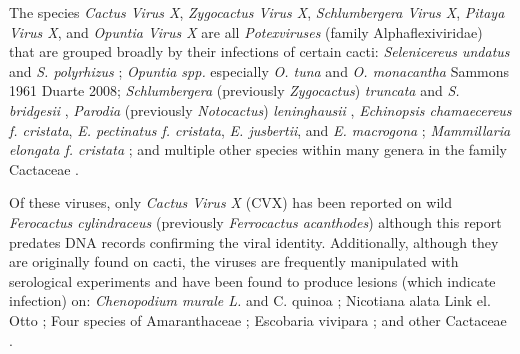 \documentclass[11pt,letterpaper,titlepage]{article}
\begin{document}
\begin{linenumbers}

The species \textit{Cactus Virus X}, \textit{Zygocactus Virus X}, \textit{Schlumbergera Virus X}, \textit{Pitaya Virus X}, and \textit{Opuntia Virus X} are all \textit{Potexviruses} (family Alphaflexiviridae) that are grouped broadly by their infections of certain cacti: \textit{Selenicereus undatus} and \textit{S. polyrhizus} \citep{li_viral_2015,peng_molecular_2016}; \textit{Opuntia spp.} especially \textit{O. tuna} \citep{koenig_molecular_2004, duarte_Potexvirus_2008} and \textit{O. monacantha} \citep{attathom_occurrence_1978} Sammons 1961 Duarte 2008; \textit{Schlumbergera} (previously \textit{Zygocactus}) \textit{truncata} and \textit{S. bridgesii} \citep{duarte_Potexvirus_2008, koenig_molecular_2004}, \textit{Parodia }(previously \textit{Notocactus}) \textit{leninghausii} \citep{park_detection_2018}, \textit{Echinopsis chamaecereus f. cristata}, \textit{E. pectinatus f. cristata}, \textit{E. jusbertii}, and \textit{E. macrogona} \citep{maliarenko_cactus_2013}; \textit{Mammillaria elongata f. cristata} \citep{maliarenko_cactus_2013}; and multiple other species within many genera in the family Cactaceae \citep{evallo_brief_2021}.

Of these viruses, only \textit{Cactus Virus X} (CVX) has been reported on wild \textit{Ferocactus cylindraceus} (previously \textit{Ferrocactus acanthodes}) \citep{attathom_occurrence_1978} although this report predates DNA records confirming the viral identity.
Additionally, although they are originally found on cacti, the viruses are frequently manipulated with serological experiments and have been found to produce lesions (which indicate infection) on: \textit{Chenopodium murale L.} \citep{maliarenko_cactus_2013} and C. quinoa \citep{attathom_identification_1978,attathom_occurrence_1978, brandes_untersuchungen_1963-1}; Nicotiana alata Link el. Otto \citep{maliarenko_cactus_2013}; Four species of Amaranthaceae \citep{attathom_identification_1978}; Escobaria vivipara \citep{attathom_identification_1978}; and other Cactaceae \citep{attathom_identification_1978}.


\end{linenumbers}
\end{document}
